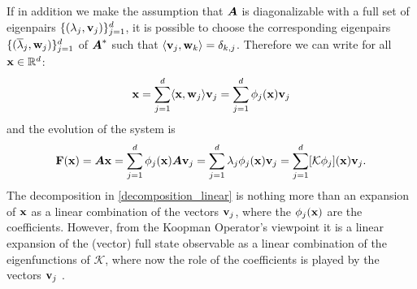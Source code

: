 If in addition we make the assumption that $\vb*{A}$ is diagonalizable with a full set of eigenpairs $\{(\lambda_j, \vb{v}_j)\}_{j=1}^{d}$, it is possible to choose the corresponding eigenpairs $\{(\overline{\lambda}_j, \vb{w}_j)\}_{j=1}^{d}$ of $\vb*{A}^*$ such that $\langle \vb{v}_j, \vb{w}_k\rangle = \delta_{k,j}$. Therefore we can write for all $\vb{x}\in\mathbb{R}^d$:
\begin{equation}
    \label{decomposition_linear}
    \vb{x} = \sum_{j=1}^d \langle \vb{x}, \vb{w}_j\rangle \vb{v}_j = \sum_{j=1}^d \phi_j(\vb{x}) \vb{v}_j
\end{equation}
and the evolution of the system is
\begin{equation}
    \label{evolution_linear}
    \vb{F}(\vb{x}) = \vb*{A}\vb{x}  = \sum_{j=1}^d \phi_j(\vb{x}) \vb*{A}\vb{v}_j = \sum_{j=1}^d \lambda_j \phi_j(\vb{x}) \vb{v}_j = \sum_{j=1}^d [\mathcal{K}\phi_j](\vb{x})\vb{v}_j.
\end{equation}
The decomposition in \eqref{decomposition_linear} is nothing more than an expansion of $\vb{x}$ as a linear combination of the vectors $\vb{v}_j$, where the $\phi_j(\vb{x})$ are the coefficients. However, from the Koopman Operator's viewpoint it is a linear expansion of the (vector) full state observable as a linear combination of the eigenfunctions of $\mathcal{K}$, where now the role of the coefficients is played by the vectors $\vb{v}_j$ \cite{rowley_spectral_2009}.  